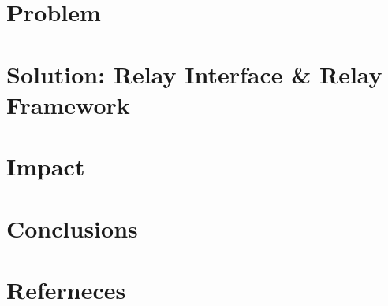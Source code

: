 \documentclass[a4paper,11pt]{report}
\begin{document}
\begin{multicols}{2}
\section{Problem}

\section{Solution: Relay Interface \& Relay Framework}

\section{Impact}

\section{Conclusions}

\section{Referneces}




\end{multicols}
\end{document}
